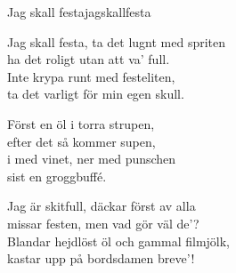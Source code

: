 \begin{song}{Jag skall festa}{jagskallfesta}

\begin{vers}
Jag skall festa, ta det lugnt med spriten\\
ha det roligt utan att va' full.\\
Inte krypa runt med festeliten,\\
ta det varligt för min egen skull.\\
\end{vers}
\begin{vers}
Först en öl i torra strupen,\\
efter det så kommer supen,\\
i med vinet, ner med punschen\\
sist en groggbuffé.\\
\end{vers}
\begin{vers}
Jag är skitfull, däckar först av alla\\
missar festen, men vad gör väl de'?\\
Blandar hejdlöst öl och gammal filmjölk,\\
kastar upp på bordsdamen breve'!\\
\end{vers}
\end{song}
